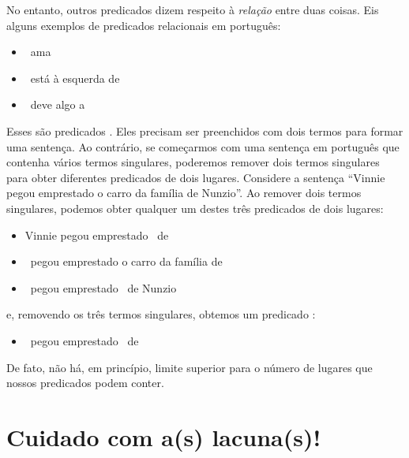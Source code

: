 No entanto, outros predicados dizem respeito à \emph{relação} entre duas coisas. Eis alguns exemplos de predicados relacionais em português:
	\begin{itemize}
\item \blank\ ama \blank
\item \blank\ está à esquerda de \blank
\item \blank\ deve algo a \blank
	\end{itemize}
Esses são predicados . Eles precisam ser preenchidos com dois termos para formar uma sentença. Ao contrário, se começarmos com uma sentença em português que contenha vários termos singulares, poderemos remover dois termos singulares para obter diferentes predicados de dois lugares. Considere a sentença \textquotedblleft Vinnie pegou emprestado o carro da família de Nunzio\textquotedblright{}. Ao remover dois termos singulares, podemos obter qualquer um destes três predicados de dois lugares:
	\begin{itemize}
\item Vinnie pegou emprestado \blank\ de \blank
\item \blank\ pegou emprestado o carro da família de \blank
\item \blank\ pegou emprestado \blank\ de Nunzio
	\end{itemize}
e, removendo os três termos singulares, obtemos um predicado :
	\begin{itemize}
\item \blank\ pegou emprestado \blank\ de \blank
	\end{itemize}
De fato, não há, em princípio, limite superior para o número de lugares que nossos predicados podem conter.

\section{Cuidado com a(s) lacuna(s)!}

